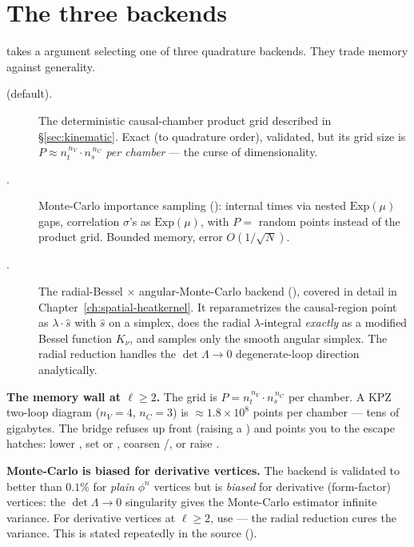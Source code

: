 \section{The three backends}\label{sec:backends}

 takes a  argument selecting one of three
quadrature backends. They trade memory against generality.

\begin{description}
  \item[ (default).] The deterministic causal-chamber product grid
        described in \S\ref{sec:kinematic}. Exact (to quadrature order), validated,
        but its grid size is $P \approx n_t^{\,n_V}\cdot n_s^{\,n_C}$ \emph{per
        chamber} --- the curse of dimensionality.
  \item[.] Monte-Carlo importance sampling
        (): internal times via nested
        $\mathrm{Exp}(\mu)$ gaps, correlation $\sigma$'s as $\mathrm{Exp}(\mu)$,
        with $P=$ random points instead of the product grid. Bounded
        memory, error $O(1/\sqrt{N})$.
  \item[.] The radial-Bessel $\times$ angular-Monte-Carlo backend
        (), covered in detail in
        Chapter~\ref{ch:spatial-heatkernel}. It reparametrizes the causal-region
        point as $\lambda\cdot\hat s$ with $\hat s$ on a simplex, does the radial
        $\lambda$-integral \emph{exactly} as a modified Bessel function $K_\nu$,
        and samples only the smooth angular simplex. The radial reduction handles
        the $\det\Lambda\to0$ degenerate-loop direction analytically.
\end{description}

\begin{gotcha}
\textbf{The memory wall at $\ell\ge2$.} The grid is $P=n_t^{\,n_V}\cdot n_s^{\,n_C}$
per chamber. A KPZ two-loop diagram ($n_V=4$, $n_C=3$) is $\approx 1.8\times10^8$
points per chamber --- tens of gigabytes. The bridge refuses up front (raising a
) and points you to the escape hatches: lower
, set  or , coarsen
/, or raise .
\end{gotcha}

\begin{gotcha}
\textbf{Monte-Carlo is biased for derivative vertices.} The  backend is
validated to better than $0.1\%$ for \emph{plain} $\phi^n$ vertices but is
\emph{biased} for derivative (form-factor) vertices: the $\det\Lambda\to0$
singularity gives the Monte-Carlo estimator infinite variance. For derivative
vertices at $\ell\ge2$, use  --- the radial
reduction cures the variance. This is stated repeatedly in the source
().
\end{gotcha}

